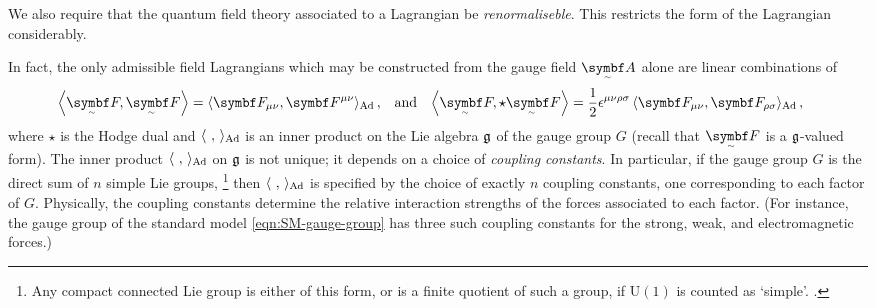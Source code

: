 \iffalse
In a classical field theory, the equations of motion are symmetric under adjustments to the Lagrangian density by a total derivative $\cal L \mapsto \cal L + \ts\dd \alpha$, since by Stokes' theorem these contribute only to boundary terms.
The dynamics of quantum field theories, on the other hand, do not enjoy this symmetry in general, because of their origin in a path integral.
For instance, the quantum mechanical amplitude that the fields $\bm\psi$ and $\tsbm F$ satisfy prescribed boundary conditions on $\partial\Omega$ surrounding some region of spacetime $\Omega \subseteq \cal M$ is given by the path integral
\begin{align}
	\cal A = \int_{\partial\Omega}\! \cal D[\bm\psi, \tsbm F] \exp\qty{\frac{i}{\hbar} \int_{\Omega}\! \LL\qty[\bm\psi, \ts\nabla_{\!A}\bm\psi, \tsbm F]}
,\end{align}
where the intended meaning of $\cal D[\cdots]$ is an integration over all field configurations on $\Omega$.
If the Lagrangian were to undergo the addition of a total derivative term $\ts\dd\alpha$, its effect would be to adjust the integrand by an overall phase $e^{i\alpha/\hbar}$ dependent on the fields.
These phases may affect the path integral through interference, leading to a different amplitude---and hence to different physics.
Thus, in QFT, total divergence terms in the Lagrangian density may not be presumptuously disregarded. \note{UNTRUE. IT HAS NO EFFECT}
\fi

We also require that the quantum field theory associated to a Lagrangian be \emph{renormaliseble}.
This restricts the form of the Lagrangian considerably.


In fact, the only admissible field Lagrangians which may be constructed from the gauge field $\tsbm A$ alone are linear combinations of
\begin{align}
	\ang{\tsbm F, \tsbm F} &= \angg{\bm F_{\mu\nu}, \bm F^{\mu\nu}}
,&	&\text{and}
&	\ang{\tsbm F, \star \tsbm F} &= \frac12\epsilon^{\mu\nu\rho\sigma}\angg{\bm F_{\mu\nu}, \bm F_{\rho\sigma}}
,\end{align}
where $\star$ is the Hodge dual and $\angg{\ ,\ }$ is an inner product on the Lie algebra $\frak g$ of the gauge group $G$ (recall that $\tsbm F$ is a $\frak g$-valued form).
The inner product $\angg{\ ,\ }$ on $\frak g$ is not unique; it depends on a choice of \emph{coupling constants}.
In particular, if the gauge group $G$ is the direct sum of $n$ simple Lie groups,%
\footnote{
	Any compact connected Lie group is either of this form, or is a finite quotient of such a group, if $\mathrm U(1)$ is counted as `simple'. \cite[§~2.4.3]{Hamilton_2017}.
}
then $\angg{\ ,\ }$ is specified by the choice of exactly $n$ coupling constants, one corresponding to each factor of $G$.
Physically, the coupling constants determine the relative interaction strengths of the forces associated to each factor.
(For instance, the gauge group of the standard model \eqref{eqn:SM-gauge-group} has three such coupling constants for the strong, weak, and electromagnetic forces.)

